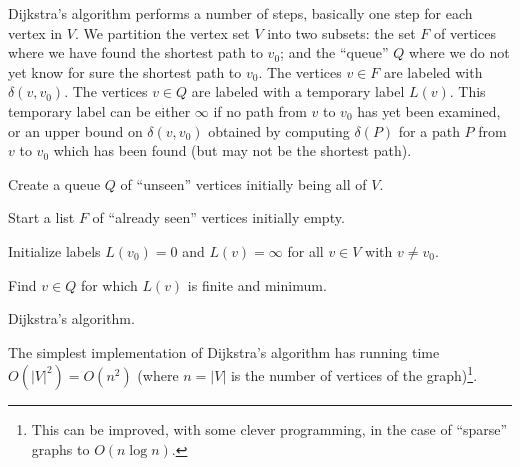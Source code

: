 Dijkstra's algorithm performs a number of steps, basically one step
for each vertex in $V$. We partition the vertex set $V$ into two
subsets: the set $F$ of vertices where we have found the shortest path
to $v_0$; and the ``queue'' $Q$ where we do not yet know for sure the
shortest path to $v_0$. The vertices $v \in F$ are labeled with
$\delta(v, v_0)$. The vertices $v \in Q$ are labeled with a temporary
label $L(v)$. This temporary label can be either $\infty$ if no path
from $v$ to $v_0$ has yet been examined, or an upper bound on
$\delta(v, v_0)$ obtained by computing $\delta(P)$ for a path $P$ from
$v$ to $v_0$ which has been found (but may not be the shortest path).

\begin{algorithm}[!htpb]
\dontprintsemicolon  %
\BlankLine
Create a queue $Q$ of ``unseen'' vertices initially being
all of $V$.\;

Start a list $F$ of ``already seen'' vertices initially empty.\;

Initialize labels $L(v_0) = 0$ and $L(v) = \infty$ for all
$v \in V$ with $v \neq v_0$.\;

Find $v \in Q$ for which $L(v)$ is finite and minimum.\;


\caption{Dijkstra's algorithm.}
\label{alg:graph_algorithms:dijkstra}
\end{algorithm}

The simplest implementation of Dijkstra's algorithm has
running time $O( | V |^2)=O(n^2)$ (where
$n=|V|$ is the number of vertices of the graph)\footnote{This
can be improved, with some clever programming,
in the case of ``sparse'' graphs to $O(n\log n)$.}.

